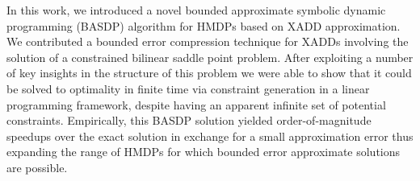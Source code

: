 
In this work, we introduced a novel bounded approximate symbolic
dynamic programming (BASDP) algorithm for HMDPs based on XADD
approximation.  We contributed a bounded error compression technique
for XADDs involving the solution of a constrained bilinear saddle
point problem.  After exploiting a number of key insights in the
structure of this problem we were able to show that it could be solved
to optimality in finite time via constraint generation in a linear
programming framework, despite having an apparent infinite set of
potential constraints.  Empirically, this BASDP solution yielded
order-of-magnitude speedups over the exact solution in exchange for a
small approximation error thus expanding the range of HMDPs
for which bounded error approximate solutions are possible.
